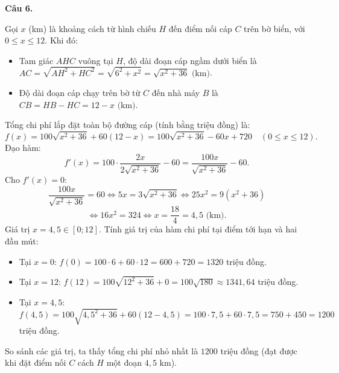 \documentclass[12pt,a4paper]{article}
\newcommand{\loigiai}[1]{\par\medskip\Needspace{4\baselineskip}\noindent\textbf{#1}\par\nobreak}
\begin{document}
\loigiai{Câu 6.}
Gọi $x$ (km) là khoảng cách từ hình chiếu $H$ đến điểm nối cáp $C$ trên bờ biển, với $0 \le x \le 12$.
Khi đó:
\begin{itemize}[leftmargin=*]
\item Tam giác $AHC$ vuông tại $H$, độ dài đoạn cáp ngầm dưới biển là $AC = \sqrt{AH^2 + HC^2} = \sqrt{6^2 + x^2} = \sqrt{x^2+36}\text{ (km)}$.
\item Độ dài đoạn cáp chạy trên bờ từ $C$ đến nhà máy $B$ là $CB = HB - HC = 12 - x\text{ (km)}$.
\end{itemize}
Tổng chi phí lắp đặt toàn bộ đường cáp (tính bằng triệu đồng) là:
\[
f(x) = 100\sqrt{x^2+36} + 60(12-x) = 100\sqrt{x^2+36} - 60x + 720\quad (0 \le x \le 12).
\]
Đạo hàm:
\[
f'(x) = 100\cdot\dfrac{2x}{2\sqrt{x^2+36}} - 60 = \dfrac{100x}{\sqrt{x^2+36}} - 60.
\]
Cho $f'(x) = 0$:
\[
\dfrac{100x}{\sqrt{x^2+36}} = 60 \iff 5x = 3\sqrt{x^2+36} \iff 25x^2 = 9(x^2+36)
\]
\[
\iff 16x^2 = 324 \iff x = \dfrac{18}{4} = 4,5\text{ (km)}.
\]
Giá trị $x = 4,5\in[0;12]$.
Tính giá trị của hàm chi phí tại điểm tới hạn và hai đầu mút:
\begin{itemize}[leftmargin=*]
\item Tại $x = 0$: $f(0) = 100\cdot 6 + 60\cdot 12 = 600 + 720 = 1320$ triệu đồng.
\item Tại $x = 12$: $f(12) = 100\sqrt{12^2+36} + 0 = 100\sqrt{180} \approx 1341,64$ triệu đồng.
\item Tại $x = 4,5$: $f(4,5) = 100\sqrt{4,5^2+36} + 60(12-4,5) = 100\cdot 7,5 + 60\cdot 7,5 = 750 + 450 = 1200$ triệu đồng.
\end{itemize}
So sánh các giá trị, ta thấy tổng chi phí nhỏ nhất là $1200$ triệu đồng (đạt được khi đặt điểm nối $C$ cách $H$ một đoạn $4,5\text{ km}$).
\end{document}
